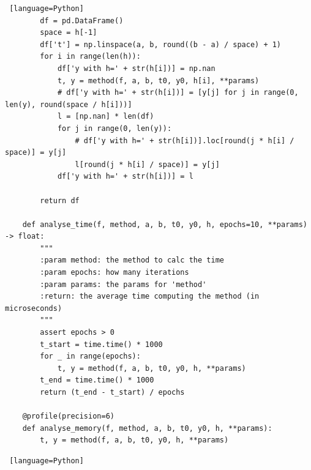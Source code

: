 \documentclass[a4paper]{article}
\begin{document}
\begin{appendices}
\begin{lstlisting} [language=Python]
        df = pd.DataFrame()
        space = h[-1]
        df['t'] = np.linspace(a, b, round((b - a) / space) + 1)
        for i in range(len(h)):
            df['y with h=' + str(h[i])] = np.nan
            t, y = method(f, a, b, t0, y0, h[i], **params)
            # df['y with h=' + str(h[i])] = [y[j] for j in range(0, len(y), round(space / h[i]))]
            l = [np.nan] * len(df)
            for j in range(0, len(y)):
                # df['y with h=' + str(h[i])].loc[round(j * h[i] / space)] = y[j]
                l[round(j * h[i] / space)] = y[j]
            df['y with h=' + str(h[i])] = l
    
        return df
    
    def analyse_time(f, method, a, b, t0, y0, h, epochs=10, **params) -> float:
        """
        :param method: the method to calc the time
        :param epochs: how many iterations
        :param params: the params for 'method'
        :return: the average time computing the method (in microseconds)
        """
        assert epochs > 0
        t_start = time.time() * 1000
        for _ in range(epochs):
            t, y = method(f, a, b, t0, y0, h, **params)
        t_end = time.time() * 1000
        return (t_end - t_start) / epochs
    
    @profile(precision=6)
    def analyse_memory(f, method, a, b, t0, y0, h, **params):
        t, y = method(f, a, b, t0, y0, h, **params)
    \end{lstlisting}
    
    \begin{lstlisting} [language=Python]
    
    \end{lstlisting}
    
    \end{appendices}
\end{document}
